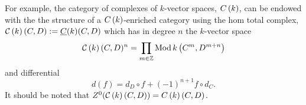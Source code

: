 For example, the category of complexes of \(k\)-vector spaces, \(C\left(k\right)\), can be endowed with the the structure of a \(C\left(k\right)\)-enriched category using the hom total complex, \(\mathcal{C}\left(k\right)(C,D) := \underline{C}(k)(C,D)\) which has in degree \(n\) the \(k\)-vector space
\[\mathcal{C}\left(k\right)(C,D)^n = \prod_{m \in \mathbb{Z}}\operatorname{Mod}k\left(C^m, D^{m + n}\right)\]
and differential
\[d(f) = d_D \circ f + (-1)^{n+1} f \circ d_C.\]
It should be noted that \(Z^0(\mathcal{C}\left(k\right)(C,D)) = C\left(k\right)(C,D)\).

